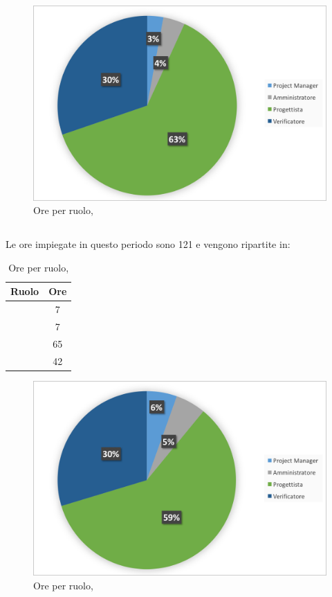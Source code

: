 \begin{figure}[H]
	\centering 
	\includegraphics[scale=0.7]{Immagini/GraficiTorte/PA.png}
	\caption{Ore per ruolo, \PA}
\end{figure}
\newpage
\subsection{\PD}
Le ore impiegate in questo periodo sono 121 e vengono ripartite in:

\begin{table}[h]
	\begin{center}
		\begin{tabular}{|c|c|}
			\hline
			\textbf{Ruolo}	& \textbf{Ore} \\
			\hline
			\Pm &	7\\
			\hline
			\Am	&	7\\
			\hline
			\Prog	&	65\\
			\hline
			\Ver	&	42\\
			\hline
		\end{tabular}
	\end{center}
	\caption{Ore per ruolo, \PD}
\end{table}

\begin{figure}[H]
	\centering 
	\includegraphics[scale=0.7]{Immagini/GraficiTorte/PD.png}
	\caption{Ore per ruolo, \PD}
\end{figure}
\newpage
